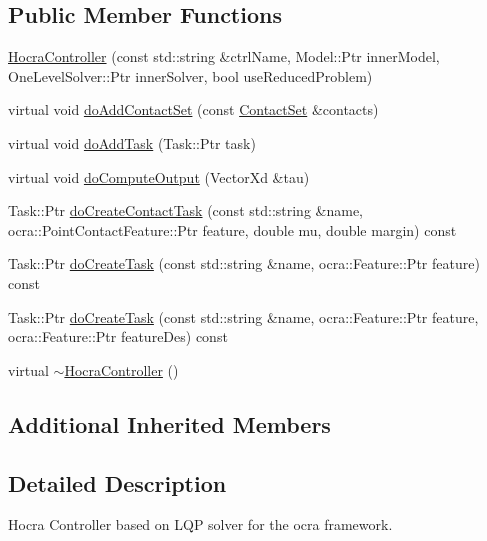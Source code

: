 \subsection*{Public Member Functions}
\begin{DoxyCompactItemize}
\item 
\hyperlink{classhocra_1_1HocraController_a8f54b0542d7024b2c8c5e47d93c36523}{Hocra\+Controller} (const std\+::string \&ctrl\+Name, Model\+::\+Ptr inner\+Model, One\+Level\+Solver\+::\+Ptr inner\+Solver, bool use\+Reduced\+Problem)
\item 
virtual void \hyperlink{classhocra_1_1HocraController_a6292f35dbfe7f2292f018c51d492ace2}{do\+Add\+Contact\+Set} (const \hyperlink{classocra_1_1ContactSet}{Contact\+Set} \&contacts)
\item 
virtual void \hyperlink{classhocra_1_1HocraController_a441fa7669cab7fb1c43c8544ea4b7e5f}{do\+Add\+Task} (Task\+::\+Ptr task)
\item 
virtual void \hyperlink{classhocra_1_1HocraController_a6308767c1f7c9110f030ea44e05e9862}{do\+Compute\+Output} (Vector\+Xd \&tau)
\item 
Task\+::\+Ptr \hyperlink{classhocra_1_1HocraController_af300fdf6fb442e4313a472a127fdebef}{do\+Create\+Contact\+Task} (const std\+::string \&name, ocra\+::\+Point\+Contact\+Feature\+::\+Ptr feature, double mu, double margin) const
\item 
Task\+::\+Ptr \hyperlink{classhocra_1_1HocraController_a3e308f54d5b535a67a51d60454ea35b0}{do\+Create\+Task} (const std\+::string \&name, ocra\+::\+Feature\+::\+Ptr feature) const
\item 
Task\+::\+Ptr \hyperlink{classhocra_1_1HocraController_a939752a2863f29c7d8be81aed6bac673}{do\+Create\+Task} (const std\+::string \&name, ocra\+::\+Feature\+::\+Ptr feature, ocra\+::\+Feature\+::\+Ptr feature\+Des) const
\item 
virtual \hyperlink{classhocra_1_1HocraController_aa87972322a67e8c7d3326e023aae44d0}{$\sim$\+Hocra\+Controller} ()
\end{DoxyCompactItemize}
\subsection*{Additional Inherited Members}


\subsection{Detailed Description}
Hocra Controller based on L\+QP solver for the ocra framework. 



